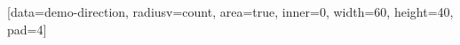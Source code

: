 \documentclass{article}
\begin{document}
\ExplSyntaxOn
\SemioVizProbeOn
\SemioVizChartsDryRun
{}
[data=demo-direction, radiusv=count, area=true, inner=0, width=60, height=40, pad=4]
\ExplSyntaxOff
\end{document}

